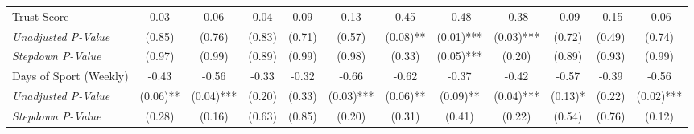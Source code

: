 \begin{tabular}{l c c c c c c c c c c c}
Trust Score & 0.03 & 0.06 & 0.04 & 0.09 & 0.13 & 0.45 & -0.48 & -0.38 & -0.09 & -0.15 & -0.06 \\
\quad \textit{Unadjusted P-Value} & (0.85) & (0.76) & (0.83) & (0.71) & (0.57) & (0.08)** & (0.01)*** & (0.03)*** & (0.72) & (0.49) & (0.74) \\
\quad \textit{Stepdown P-Value} & (0.97) & (0.99) & (0.89) & (0.99) & (0.98) & (0.33) & (0.05)*** & (0.20) & (0.89) & (0.93) & (0.99) \\
Days of Sport (Weekly) & -0.43 & -0.56 & -0.33 & -0.32 & -0.66 & -0.62 & -0.37 & -0.42 & -0.57 & -0.39 & -0.56 \\
\quad \textit{Unadjusted P-Value} & (0.06)** & (0.04)*** & (0.20) & (0.33) & (0.03)*** & (0.06)** & (0.09)** & (0.04)*** & (0.13)* & (0.22) & (0.02)*** \\
\quad \textit{Stepdown P-Value} & (0.28) & (0.16) & (0.63) & (0.85) & (0.20) & (0.31) & (0.41) & (0.22) & (0.54) & (0.76) & (0.12) \\
\bottomrule
\end{tabular}
